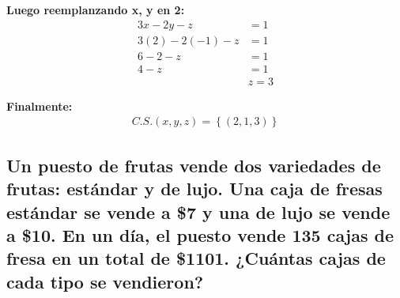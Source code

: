 \documentclass[11pt, a4paper]{article}
\begin{document}
\begin{multicols}{2}
  \textbf{Luego reemplanzando x, y en 2:}
  \begin{align*}
    3x-2y-z &= 1\\
    3\left(2\right) -2\left(-1\right)-z &=1\\
    6 - 2 - z &= 1\\
    4 - z &= 1\\
    &\boxed{z = 3}
  \end{align*}
\end{multicols}
\textbf{Finalmente:}
\begin{align*}
  C.S. \left(x,y,z\right) = \left\{(2,1,3)\right\}
\end{align*}
\newpage
\subsection{Un puesto de frutas vende dos variedades de frutas: estándar y de lujo. Una caja de fresas estándar se vende a \$7 y una de lujo se vende a \$10. En un día, el puesto vende 135 cajas de fresa en un total de \$1101. ¿Cuántas cajas de cada tipo se vendieron?}
\end{document}
